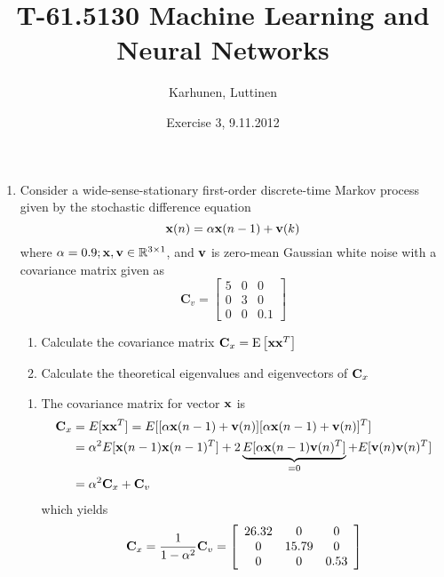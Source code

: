 
\title{T-61.5130 Machine Learning and Neural Networks}
\author{Karhunen, Luttinen}
\date{Exercise 3, 9.11.2012}





\maketitle

\begin{enumerate}
  
\item Consider a wide-sense-stationary
  first-order discrete-time Markov process given by the stochastic
  difference equation
  \[
  {\bf x}(n) = \alpha {\bf x}(n-1) + {\bf v}(k)
  \]
  where $\alpha = 0.9; {\bf x}, {\bf v} \in \mathbb{R}^{3\times 1}$,
  and ${\bf v}$ is zero-mean Gaussian white noise with a covariance
  matrix given as
  \[ \textbf{C}_v = \left[ \begin{array}{ccc}
      5 & 0 & 0 \\
      0 & 3 & 0 \\
      0 & 0 & 0.1 \end{array} \right]\]

  \begin{enumerate}
  \item Calculate the covariance matrix ${\bf C}_x = \text{E}\left[
      {\bf xx}^T \right]$
  \item Calculate the theoretical eigenvalues and eigenvectors of
    ${\bf C}_x$
  \end{enumerate}
  
  \begin{solution}

    \begin{enumerate}
    \item 
      The covariance matrix for vector $\mathbf{x}$ is
      \[
      \begin{split}
        \mathbf{C}_x &= E[\mathbf{x} \mathbf{x}^T] =
        E[[\alpha\mathbf{x}(n-1)+\mathbf{v}(n)]
        [\alpha\mathbf{x}(n-1)+\mathbf{v}(n)]^T]
        \\
        &=\alpha^2 E[\mathbf{x}(n-1)\mathbf{x}(n-1)^T]+2
        \underbrace{E[\alpha \mathbf{x}(n-1)\mathbf{v}(n)^T]}_{=0}+
        E[\mathbf{v}(n)\mathbf{v}(n)^T]
        \\
        &=\alpha^2 \mathbf{C}_x + \mathbf{C}_v
      \end{split}
      \]
      which yields
      \[
      \mathbf{C}_x = \frac{1}{1-\alpha^2}\mathbf{C}_v=
      \left[\begin{array}{ccc}
          26.32 & 0     & 0 \\
          0     & 15.79 & 0 \\
          0     & 0     & 0.53 
        \end{array}\right]
      \]


\end{enumerate}
\end{solution}
\end{enumerate}
